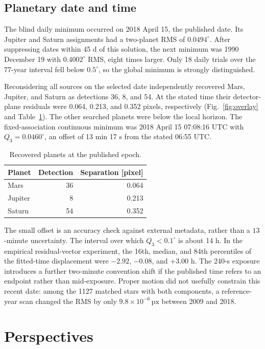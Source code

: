 \documentclass{aa}
\newcommand{\px}{\,\mathrm{px}}
\begin{document}
\subsection{Planetary date and time}

The blind daily minimum occurred on 2018 April 15, the published date. Its
Jupiter and Saturn assignments had a two-planet RMS of $0.0494^\circ$. After
suppressing dates within 45 d of this solution, the next minimum was 1990
December 19 with $0.4002^\circ$ RMS, eight times larger. Only 18 daily trials
over the 77-year interval fell below $0.5^\circ$, so the global minimum is
strongly distinguished.

Reconsidering all sources on the selected date independently recovered Mars,
Jupiter, and Saturn as detections 36, 8, and 54. At the stated time their
detector-plane residuals were 0.064, 0.213, and 0.352 pixels, respectively
(Fig.~\ref{fig:overlay} and Table~\ref{tab:planets}). The other searched planets
were below the local horizon. The fixed-association continuous minimum was
2018 April 15 07:08:16 UTC with $Q_3=0.0460^\circ$, an offset of 13 min 17 s
from the stated 06:55 UTC.

\begin{table}
  \caption{Recovered planets at the published epoch.}
  \label{tab:planets}
  \centering
  \begin{tabular}{lrr}
    \hline\hline
    Planet & Detection & Separation [pixel] \\
    \hline
    Mars    & 36 & 0.064 \\
    Jupiter &  8 & 0.213 \\
    Saturn  & 54 & 0.352 \\
    \hline
  \end{tabular}
\end{table}

The small offset is an accuracy check against external metadata, rather than a
$13$-minute uncertainty. The interval over which $Q_3<0.1^\circ$ is about
14 h. In the empirical residual-vector experiment, the 16th, median, and 84th
percentiles of the fitted-time displacement were $-2.92$, $-0.08$, and
$+3.00$ h. The 240-s exposure introduces a further two-minute convention shift
if the published time refers to an endpoint rather than mid-exposure. Proper
motion did not usefully constrain this recent date: among the 1127 matched stars
with both components, a reference-year scan changed the RMS by only
$9.8\times10^{-6}\px$ between 2009 and 2018.

\section{Perspectives}
\label{sec:perspectives}
\end{document}
